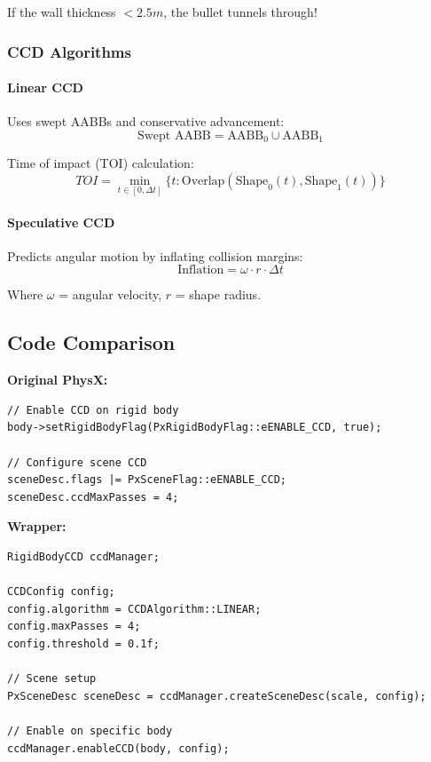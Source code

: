 If the wall thickness $< 2.5m$, the bullet tunnels through!

\subsubsection{CCD Algorithms}

\paragraph{Linear CCD}

Uses swept AABBs and conservative advancement:
\begin{equation}
\text{Swept AABB} = \text{AABB}_0 \cup \text{AABB}_1
\end{equation}

Time of impact (TOI) calculation:
\begin{equation}
TOI = \min_{t \in [0, \Delta t]} \{ t : \text{Overlap}(\text{Shape}_0(t), \text{Shape}_1(t)) \}
\end{equation}

\paragraph{Speculative CCD}

Predicts angular motion by inflating collision margins:
\begin{equation}
\text{Inflation} = \omega \cdot r \cdot \Delta t
\end{equation}

Where $\omega$ = angular velocity, $r$ = shape radius.


\subsection{Code Comparison}

\textbf{Original PhysX:}
\begin{lstlisting}[caption={Direct CCD flag setup}]
// Enable CCD on rigid body
body->setRigidBodyFlag(PxRigidBodyFlag::eENABLE_CCD, true);

// Configure scene CCD
sceneDesc.flags |= PxSceneFlag::eENABLE_CCD;
sceneDesc.ccdMaxPasses = 4;
\end{lstlisting}

\textbf{Wrapper:}
\begin{lstlisting}[caption={Config-driven CCD}]
RigidBodyCCD ccdManager;

CCDConfig config;
config.algorithm = CCDAlgorithm::LINEAR;
config.maxPasses = 4;
config.threshold = 0.1f;

// Scene setup
PxSceneDesc sceneDesc = ccdManager.createSceneDesc(scale, config);

// Enable on specific body
ccdManager.enableCCD(body, config);
\end{lstlisting}

